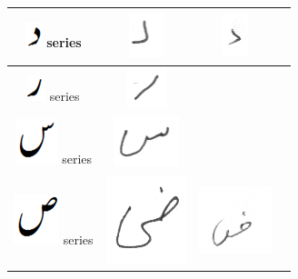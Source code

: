 \begin{table}[h]
\begin{tabular}{@{}cccc@{}}
\hline
\includegraphics[scale=0.25]{daal_orig} series & \includegraphics[scale=0.15]{125} & \includegraphics[scale=0.15]{126}  &  \\
\hline
\includegraphics[scale=0.25]{re_orig} series & \includegraphics[scale=0.15]{127} &  &  \\
\hline
\includegraphics[scale=0.25]{seen_orig} series & \includegraphics[scale=0.15]{128} &  &  \\
\hline
\includegraphics[scale=0.20]{suad_orig} series & \includegraphics[scale=0.15]{129} & \includegraphics[scale=0.15]{130}  &  \\

\end{tabular}
\end{table}
